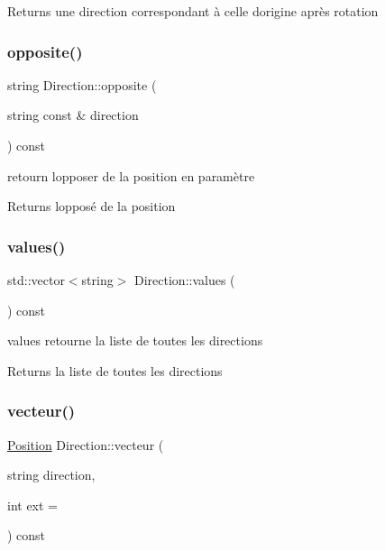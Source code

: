 \begin{DoxyReturn}{Returns}
une direction correspondant à celle d\textquotesingle{}origine après rotation 
\end{DoxyReturn}
\mbox{\label{class_direction_aca966ec39d7529ca7be6a0073f0d3710}} 
\subsubsection{\texorpdfstring{opposite()}{opposite()}}
{\footnotesize\ttfamily string Direction\+::opposite (\begin{DoxyParamCaption}\item[{string const \&}]{direction }\end{DoxyParamCaption}) const}



retourn l\textquotesingle{}opposer de la position en paramètre 

\begin{DoxyReturn}{Returns}
l\textquotesingle{}opposé de la position 
\end{DoxyReturn}
\mbox{\label{class_direction_a48435a79df040ca9a5111c45ed26e9ec}} 
\subsubsection{\texorpdfstring{values()}{values()}}
{\footnotesize\ttfamily std\+::vector$<$string$>$ Direction\+::values (\begin{DoxyParamCaption}{ }\end{DoxyParamCaption}) const\hspace{0.3cm}{\ttfamily [inline]}}



values retourne la liste de toutes les directions 

\begin{DoxyReturn}{Returns}
la liste de toutes les directions 
\end{DoxyReturn}
\mbox{\label{class_direction_a3be77e6a81164f95ebdef81001263d75}} 
\subsubsection{\texorpdfstring{vecteur()}{vecteur()}}
{\footnotesize\ttfamily \mbox{\hyperlink{class_position}{Position}} Direction\+::vecteur (\begin{DoxyParamCaption}\item[{string}]{direction,  }\item[{int}]{ext = {} }\end{DoxyParamCaption}) const\hspace{0.3cm}{\ttfamily [inline]}}



